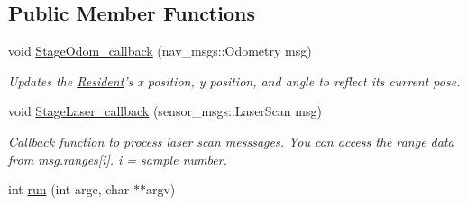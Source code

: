 \subsection*{Public Member Functions}
\begin{DoxyCompactItemize}
\item 
void \hyperlink{classResident_ae1406a27c978147c7816e57f9ed13aed}{Stage\-Odom\-\_\-callback} (nav\-\_\-msgs\-::\-Odometry msg)
\begin{DoxyCompactList}\small\item\em Updates the \hyperlink{classResident}{Resident}'s x position, y position, and angle to reflect its current pose. \end{DoxyCompactList}\item 
void \hyperlink{classResident_a6745ec218b7e451eb7ba2ca88fa2aca9}{Stage\-Laser\-\_\-callback} (sensor\-\_\-msgs\-::\-Laser\-Scan msg)
\begin{DoxyCompactList}\small\item\em Callback function to process laser scan messsages. You can access the range data from msg.\-ranges\mbox{[}i\mbox{]}. i = sample number. \end{DoxyCompactList}\item 
\hypertarget{classResident_aa4cbafa8f6cf586b53a774a8f1d81aa6}{int \hyperlink{classResident_aa4cbafa8f6cf586b53a774a8f1d81aa6}{run} (int argc, char $\ast$$\ast$argv)}\label{classResident_aa4cbafa8f6cf586b53a774a8f1d81aa6}


\end{DoxyCompactItemize}
